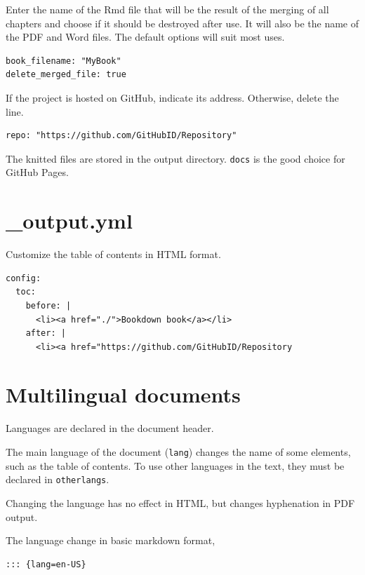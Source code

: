 \documentclass[
  12pt,
  american,
  a4paper,
  extrafontsizes,onecolumn,openright
  ]{memoir}
\begin{document}
Enter the name of the Rmd file that will be the result of the merging of all chapters and choose if it should be destroyed after use.
It will also be the name of the PDF and Word files.
The default options will suit most uses.

\begin{verbatim}
book_filename: "MyBook"
delete_merged_file: true
\end{verbatim}

If the project is hosted on GitHub, indicate its address.
Otherwise, delete the line.

\begin{verbatim}
repo: "https://github.com/GitHubID/Repository"
\end{verbatim}

The knitted files are stored in the output directory.
\texttt{docs} is the good choice for GitHub Pages.

\hypertarget{output.yml}{%
\section{\_output.yml}\label{output.yml}}

Customize the table of contents in HTML format.

\begin{verbatim}
config:
  toc:
    before: |
      <li><a href="./">Bookdown book</a></li>
    after: |
      <li><a href="https://github.com/GitHubID/Repository
\end{verbatim}

\hypertarget{multilingual-documents}{%
\section{Multilingual documents}\label{multilingual-documents}}

Languages are declared in the document header.

The main language of the document (\texttt{lang}) changes the name of some elements, such as the table of contents.
To use other languages in the text, they must be declared in \texttt{otherlangs}.

Changing the language has no effect in HTML, but changes hyphenation in PDF output.

The language change in basic markdown format,

\begin{verbatim}
::: {lang=en-US}
\end{verbatim}
\end{document}
